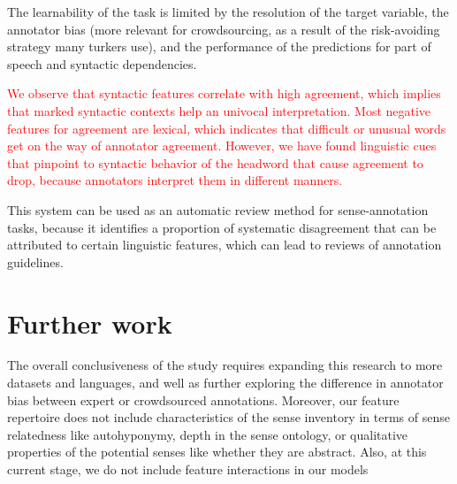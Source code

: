 \documentclass[11pt,a4paper]{article}
\begin{document}
 The learnability of the task is limited by the resolution of the target variable, the annotator bias (more relevant for crowdsourcing, as a result of the risk-avoiding strategy many turkers use), and the performance of the predictions for part of speech and syntactic dependencies.


\textcolor{red}{We observe that syntactic features correlate with high agreement, which implies that marked syntactic contexts help an univocal interpretation. Most negative features for agreement are lexical, which indicates that difficult or unusual words get on the way of annotator agreement. However, we have found linguistic cues that pinpoint to syntactic behavior of the headword that cause agreement to drop, because annotators interpret them in different manners. }

This system can be used as an automatic review method for sense-annotation tasks, because it identifies a proportion of systematic disagreement that can be attributed to certain linguistic features, which can lead to reviews of annotation guidelines. 


\section{Further work}
The overall conclusiveness of the study requires expanding this research to more datasets and languages, and well as further exploring the difference in annotator bias between  expert or crowdsourced annotations. Moreover, our feature repertoire does not include characteristics of the sense inventory in terms of sense relatedness like autohyponymy, depth in the sense ontology, or qualitative properties of the potential senses like whether they are abstract. Also, at this current stage, we do not include feature interactions in our models



\end{document}
